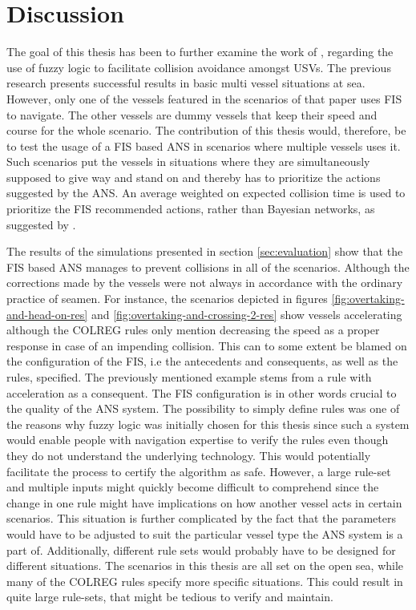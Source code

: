 \chapter{Discussion}%
\label{chap:disc}
The goal of this thesis has been to further examine the work of \textcite{perera2012intelligent}, regarding the use of fuzzy logic to facilitate collision avoidance amongst USVs. The previous research presents successful results in
basic multi vessel situations at sea. However, only one of the vessels featured in the scenarios of that paper uses FIS to navigate. The other vessels
are dummy vessels that keep their speed and course for the whole scenario.
The contribution of this thesis would, therefore, be to test the usage of a FIS
based ANS in scenarios where multiple vessels uses it. Such scenarios put the vessels in situations where they are simultaneously supposed to give way and stand on and thereby has to prioritize the actions suggested by the ANS. An average weighted on expected collision time is used to prioritize the FIS recommended actions, rather
than Bayesian networks, as suggested by \textcite{perera2012intelligent}.


The results of the simulations presented in section \ref{sec:evaluation} show that the FIS based ANS manages to prevent collisions in all of the scenarios. Although the corrections made by the vessels were not always in accordance with the ordinary practice of seamen. For instance, the scenarios depicted in figures \ref{fig:overtaking-and-head-on-res} and \ref{fig:overtaking-and-crossing-2-res} show vessels accelerating although the COLREG rules only mention decreasing the speed as a proper response in case of an impending collision. This can to some extent be blamed on the configuration of the FIS, i.e the  antecedents and consequents, as well as the rules, specified. The previously mentioned example stems from a rule with acceleration as a consequent.  The FIS configuration is in other words crucial to the quality of the ANS system. The possibility to simply define rules was one of the reasons why fuzzy logic was initially chosen for this thesis since such a system would enable people with navigation expertise to verify the rules even though they do not understand the underlying technology. This would potentially facilitate the process to certify the algorithm as safe. However, a large rule-set  and multiple inputs might quickly become difficult to comprehend since the change in one rule might have implications on how another vessel acts in  certain scenarios. This situation is further complicated by the fact that the parameters would have to be adjusted to suit the particular vessel type the ANS system is a part of. Additionally, different rule sets would probably have to be designed for different situations. The scenarios in this thesis are all set on the open sea, while many of the COLREG rules specify more specific situations. This could result in quite large rule-sets, that might be tedious to verify and maintain.

